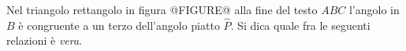 Nel triangolo rettangolo in 
figura @FIGURE@ alla fine del testo
$ABC$ l'angolo in $B$ è congruente a 
un terzo dell'angolo piatto $\widehat P$. 
Si dica quale fra le seguenti relazioni
è \emph{vera}.